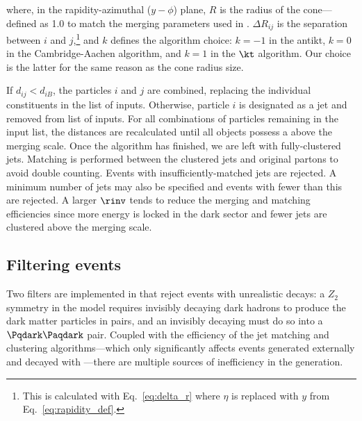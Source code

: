 where, in the rapidity-azimuthal ($y-\phi$) plane, $R$ is the radius of the cone---defined as 1.0 to match the merging parameters used in \MADGRAPH. $\Delta R_{ij}$ is the separation between $i$ and $j$,\footnote{This is calculated with Eq.~\ref{eq:delta_r} where $\eta$ is replaced with $y$ from Eq.~\ref{eq:rapidity_def}.} and $k$ defines the algorithm choice: $k = -\text{1}$ in the \gls{antikt}, $k = \text{0}$ in the Cambridge-Aachen algorithm, and $k = \text{1}$ in the $\kt$ algorithm. Our choice is the latter for the same reason as the cone radius size.

If $d_{ij} < d_{iB}$, the particles $i$ and $j$ are combined, replacing the individual constituents in the list of inputs. Otherwise, particle $i$ is designated as a jet and removed from list of inputs. For all combinations of particles remaining in the input list, the distances are recalculated until all objects possess a \pt above the merging scale. Once the algorithm has finished, we are left with fully-clustered \glspl{jet}. Matching is performed between the clustered \glspl{jet} and original partons to avoid double counting. Events with insufficiently-matched \glspl{jet} are rejected. A minimum number of \glspl{jet} may also be specified and events with fewer than this are rejected. A larger $\rinv$ tends to reduce the merging and matching efficiencies since more energy is locked in the dark sector and fewer \glspl{jet} are clustered above the merging scale.





\subsection{Filtering events}
\label{subsec:svj_pythia_filters}

Two filters are implemented in \PYTHIA that reject events with unrealistic decays: a $Z_2$ symmetry in the model requires invisibly decaying dark hadrons to produce the dark matter particles in pairs, and an invisibly decaying \PZprime must do so into a $\Pqdark\Paqdark$ pair. Coupled with the efficiency of the \gls{jet} matching and clustering algorithms---which only significantly affects events generated externally and decayed with \PYTHIA---there are multiple sources of inefficiency in the generation.


